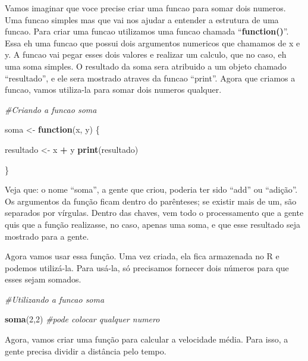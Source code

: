 \documentclass[
]{book}
\newenvironment{Shaded}{\begin{snugshade}}{\end{snugshade}}
\newcommand{\CommentTok}[1]{\textcolor[rgb]{0.56,0.35,0.01}{\textit{#1}}}
\newcommand{\ControlFlowTok}[1]{\textcolor[rgb]{0.13,0.29,0.53}{\textbf{#1}}}
\newcommand{\DecValTok}[1]{\textcolor[rgb]{0.00,0.00,0.81}{#1}}
\newcommand{\FunctionTok}[1]{\textcolor[rgb]{0.13,0.29,0.53}{\textbf{#1}}}
\newcommand{\NormalTok}[1]{#1}
\newcommand{\OtherTok}[1]{\textcolor[rgb]{0.56,0.35,0.01}{#1}}
\newcommand{\SpecialCharTok}[1]{\textcolor[rgb]{0.81,0.36,0.00}{\textbf{#1}}}
\begin{document}
Vamos imaginar que voce precise criar uma funcao para somar dois numeros. Uma funcao simples mas que vai nos ajudar a entender a estrutura de uma funcao. Para criar uma funcao utilizamos uma funcao chamada ``\textbf{function()}''. Essa eh uma funcao que possui dois argumentos numericos que chamamos de x e y. A funcao vai pegar esses dois valores e realizar um calculo, que no caso, eh uma soma simples. O resultado da soma sera atribuido a um objeto chamado ``resultado'', e ele sera mostrado atraves da funcao ``print''. Agora que criamos a funcao, vamos utiliza-la para somar dois numeros qualquer.

\begin{Shaded}
\begin{Highlighting}[]
\CommentTok{\#Criando a funcao soma}

\NormalTok{soma }\OtherTok{\textless{}{-}} \ControlFlowTok{function}\NormalTok{(x, y) \{}

\NormalTok{resultado }\OtherTok{\textless{}{-}}\NormalTok{ x }\SpecialCharTok{+}\NormalTok{ y}
\FunctionTok{print}\NormalTok{(resultado)}

\NormalTok{\}}
\end{Highlighting}
\end{Shaded}

Veja que: o nome ``soma'', a gente que criou, poderia ter sido ``add'' ou ``adição''. Os argumentos da função ficam dentro do parênteses; se existir mais de um, são separados por vírgulas. Dentro das chaves, vem todo o processamento que a gente quis que a função realizasse, no caso, apenas uma soma, e que esse resultado seja mostrado para a gente.

Agora vamos usar essa função. Uma vez criada, ela fica armazenada no R e podemos utilizá-la. Para usá-la, só precisamos fornecer dois números para que esses sejam somados.

\begin{Shaded}
\begin{Highlighting}[]
\CommentTok{\#Utilizando a funcao soma}

\FunctionTok{soma}\NormalTok{(}\DecValTok{2}\NormalTok{,}\DecValTok{2}\NormalTok{) }\CommentTok{\#pode colocar qualquer numero}
\end{Highlighting}
\end{Shaded}

Agora, vamos criar uma função para calcular a velocidade média. Para isso, a gente precisa dividir a distância pelo tempo.
\end{document}
